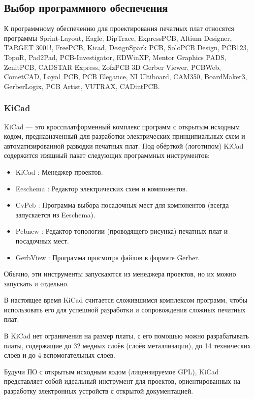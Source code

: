 \subsection{Выбор программного обеспечения}
К программному обеспечению для проектирования печатных плат относятся программы Sprint-Layout, Eagle, DipTrace, ExpressPCB, Altium Designer, TARGET 3001!,
FreePCB, Kicad, DesignSpark PCB, SoloPCB Design, PCB123, TopoR, Pad2Pad, PCB-Investigator, EDWinXP,
Mentor Graphics PADS, ZenitPCB, CADSTAR Express, ZofzPCB 3D Gerber Viewer, PCBWeb, CometCAD, Layo1
PCB, PCB Elegance, NI Ultiboard, CAM350, BoardMaker3, GerberLogix, PCB Artist, VUTRAX, CADintPCB.

\subsubsection{KiCad}
KiCad — это кроссплатформенный комплекс программ с открытым исходным кодом, предназначенный для разработки электрических принципиальных схем и автоматизированной разводки печатных плат. Под обёрткой (логотипом) KiCad содержится изящный пакет следующих программных инструментов:

\begin{itemize}
    \item KiCad : Менеджер проектов.
    \item Eeschema : Редактор электрических схем и компонентов.
    \item CvPcb : Программа выбора посадочных мест для компонентов (всегда запускается из Eeschema).
    \item Pcbnew : Редактор топологии (проводящего рисунка) печатных плат и посадочных мест.
    \item GerbView : Программа просмотра файлов в формате Gerber.

\end{itemize}


Обычно, эти инструменты запускаются из менеджера проектов, но их можно запускать и отдельно.


В настоящее время KiCad считается сложившимся комплексом программ, чтобы использовать его для успешной разработки и сопровождения сложных печатных плат.


В KiCad нет ограничения на размер платы, с его помощью можно разрабатывать платы, содержащие до 32 медных слоёв (слоёв металлизации), до 14 технических слоёв и до 4 вспомогательных слоёв.


Будучи ПО с открытым исходным кодом (лицензируемое GPL), KiCad представляет собой идеальный инструмент для проектов, ориентированных на разработку электронных устройств с открытой документацией.

